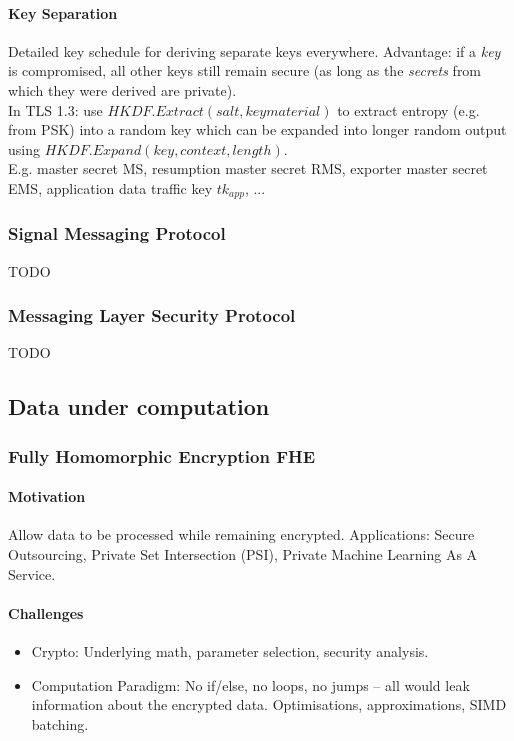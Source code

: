 \paragraph{Key Separation}
Detailed key schedule for deriving separate keys everywhere.
Advantage: if a \emph{key} is compromised, all other keys still remain secure
(as long as the \emph{secrets} from which they were derived are private).
\\
In TLS 1.3: use $HKDF.Extract(salt, keymaterial)$ to extract entropy (e.g. from PSK)
into a random key which can be expanded into longer random output using $HKDF.Expand(key, context, length)$.
\\
E.g. master secret MS, resumption master secret RMS, exporter master secret EMS,
application data traffic key $tk_{app}$, ...


\subsubsection{Signal Messaging Protocol}

TODO


\subsubsection{Messaging Layer Security Protocol}

TODO


\subsection{Data under computation}

\subsubsection{Fully Homomorphic Encryption FHE}

\paragraph{Motivation}
Allow data to be processed while remaining encrypted.
Applications: Secure Outsourcing, Private Set Intersection (PSI), Private Machine Learning As A Service.

\paragraph{Challenges}
\begin{itemize}
\item Crypto: Underlying math, parameter selection, security analysis.
\item Computation Paradigm: No if/else, no loops, no jumps -- all would leak
information about the encrypted data. Optimisations, approximations, SIMD batching.
\end{itemize}

